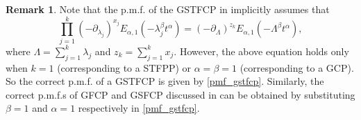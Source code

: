 \documentclass[11pt,oneside,reqno]{amsart}
\theoremstyle{definition}
\newtheorem{remark}{\bf Remark}[section]
\theoremstyle{remarkstyle}
\begin{document}
\begin{remark}
    Note that the p.m.f. of the GSTFCP in \citet{Katariaarxiv} implicitly assumes that
    \begin{equation*}
        \prod_{j=1}^{k}(-\partial_{\lambda_j})^{x_j}E_{\alpha,1}(-\lambda_j^\beta t^\alpha)=(-\partial_{\Lambda})^{z_k}E_{\alpha,1}(-\Lambda^\beta t^\alpha),
    \end{equation*}
    where $\Lambda=\sum_{j=1}^{k}\lambda_j$ and $z_k=\sum_{j=1}^{k}x_j$. However, the above equation holds only when $k=1$ (corresponding to a STFPP) or $\alpha=\beta=1$ (corresponding to a GCP). So the correct p.m.f. of a GSTFCP is given by \eqref{pmf_gstfcp}. Similarly, the correct p.m.f.s of GFCP and GSFCP discussed in \citet{Katariaarxiv} can be obtained by substituting $\beta=1$ and $\alpha=1$ respectively in \eqref{pmf_gstfcp}.
\end{remark}
\end{document}
